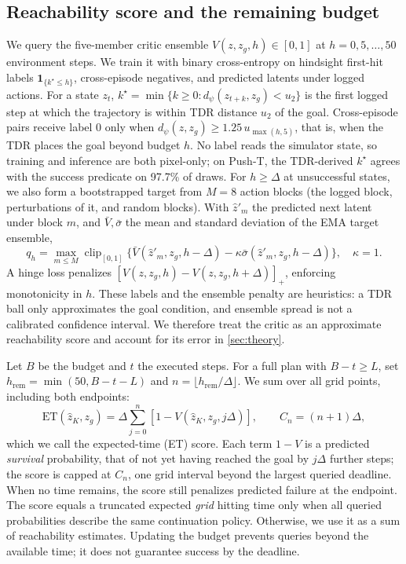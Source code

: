 \documentclass{article} %
\newcommand{\ET}{\mathrm{ET}}
\newcommand{\dd}{d_{\psi}}
\newcommand{\ind}{\mathbf{1}}
\theoremstyle{definition}
\theoremstyle{remark}
\begin{document}
\subsection{Reachability score and the remaining budget}
\label{sec:critic}
We query the five-member critic ensemble $V(z,z_g,h)\in[0,1]$ at
$h=0,5,\ldots,50$ environment steps. We train it with binary cross-entropy on hindsight
first-hit labels $\ind_{\{k^\star\le h\}}$, cross-episode negatives, and predicted latents under
logged actions. For a state $z_t$, $k^\star=\min\{k\ge0:\dd(z_{t+k},z_g)<u_2\}$ is the first
logged step at which the trajectory is within TDR distance $u_2$ of the goal.
Cross-episode pairs receive label $0$ only when $\dd(z,z_g)\ge 1.25\,u_{\max(h,5)}$,
that is, when the TDR places the goal beyond budget $h$.
No label reads the simulator state, so training and inference are both pixel-only;
on Push-T, the TDR-derived $k^\star$ agrees with the success predicate on 97.7\% of draws.
For $h\ge\Delta$ at unsuccessful states, we also form a bootstrapped target from $M=8$ action
blocks (the logged block, perturbations of it, and random blocks). With $\hat z'_m$ the
predicted next latent under block $m$, and $\bar V,\bar\sigma$ the mean and standard deviation of
the EMA target ensemble,
\begin{equation}
 q_h=\max_{m\le M}
 \operatorname{clip}_{[0,1]}
 \{\bar V(\hat z'_m,z_g,h-\Delta)-\kappa\bar\sigma(\hat z'_m,z_g,h-\Delta)\},
 \quad \kappa=1 .
 \label{eq:critic-bootstrap}
\end{equation}
A hinge loss penalizes $[V(z,z_g,h)-V(z,z_g,h+\Delta)]_+$, enforcing monotonicity in $h$.
These labels and the ensemble penalty are heuristics: a TDR ball only approximates the goal
condition, and ensemble spread is not a calibrated confidence interval. We therefore treat
the critic as an approximate reachability score and account for its error in \cref{sec:theory}.

Let $B$ be the budget and $t$ the executed steps. For a full plan with $B-t\ge L$,
set $h_{\mathrm{rem}}=\min(50,B-t-L)$ and
$n=\lfloor h_{\mathrm{rem}}/\Delta\rfloor$. We sum over all grid points, including both endpoints:
\begin{equation}
 \ET(\hat z_K,z_g)=\Delta\sum_{j=0}^{n}
                    [1-V(\hat z_K,z_g,j\Delta)],\qquad C_n=(n+1)\Delta,
 \label{eq:et}
\end{equation}
which we call the expected-time (ET) score.
Each term $1-V$ is a predicted \emph{survival} probability, that of not yet having reached the
goal by $j\Delta$ further steps; the score is capped at $C_n$, one grid interval beyond the
largest queried deadline. When no time remains, the score still penalizes predicted failure at the endpoint.
The score equals a truncated expected \emph{grid} hitting time only when all queried
probabilities describe the same continuation policy. Otherwise, we use it as a sum of
reachability estimates. Updating the budget prevents queries beyond the available time;
it does not guarantee success by the deadline.
\end{document}
